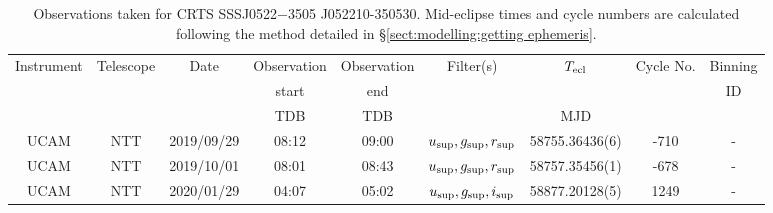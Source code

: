 \begin{table}
	\begin{center}
		\caption{Observations taken for CRTS SSSJ0522$-$3505 J052210-350530. Mid-eclipse times and cycle numbers are calculated following the method detailed in \S\ref{sect:modelling:getting ephemeris}.}
		\label{table:observing:observation logs SSSJ0522-3505}
		\begin{tabular}{ccccccccc}
			\hline
			Instrument & Telescope & Date & Observation  & Observation  & Filter(s) & $T_{\rm ecl}$ & Cycle No. & Binning \\
			 &  &  &  start &  end &  &  &  & ID \\
			 &  &  & TDB & TDB &  & MJD &  &  \\
			\hline
			\hline
			UCAM & NTT & 2019/09/29 & 08:12    & 09:00    & $u_{\rm sup},g_{\rm sup},r_{\rm sup}$ & 58755.36436(6)  &  -710 & - \\
			UCAM & NTT & 2019/10/01 & 08:01    & 08:43    & $u_{\rm sup},g_{\rm sup},r_{\rm sup}$ & 58757.35456(1)  &  -678 & - \\
			UCAM & NTT & 2020/01/29 & 04:07    & 05:02    & $u_{\rm sup},g_{\rm sup},i_{\rm sup}$ & 58877.20128(5)  &  1249 & - \\
		   \hline
		\end{tabular}
	\end{center}
\end{table}